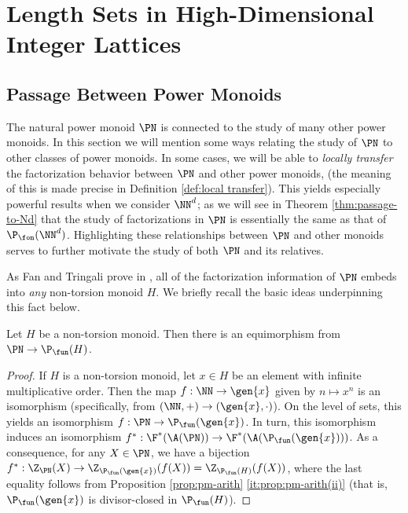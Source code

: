 
\chapter{Length Sets in High-Dimensional Integer Lattices} \label{ch:lattices}
\section{Passage Between Power Monoids}\label{sec:passage}


The natural power monoid $\PN$ is connected to the study of many other power monoids.
In this section we will mention some ways relating the study of $\PN$ to other classes of power monoids.
In some cases, we will be able to \textit{locally transfer} the factorization behavior between $\PN$ and other power monoids, (the meaning of this is made precise in Definition \ref{def:local transfer}).
This yields especially powerful results when we consider $\NN^d$; as we will see in Theorem \ref{thm:passage-to-Nd} that the study of factorizations in $\PN$ is essentially the same as that of $\P_\fon(\NN^d)$.
Highlighting these relationships between $\PN$ and other monoids serves to further motivate the study of both $\PN$ and its relatives.


As Fan and Tringali prove in \cite[Theorem 3.8, Theorem 4.11]{fan-tringali18}, all of the factorization information of $\PN$ embeds into \textit{any} non-torsion monoid $H$.
We briefly recall the basic ideas underpinning this fact below.

\begin{prop}\label{prop:natural-to-non-tors}
	Let $H$ be a non-torsion monoid.
	Then there is an equimorphism from $\PN \to \P_\fun(H)$.
\end{prop}
\begin{proof}
	If $H$ is a non-torsion monoid, let $x\in H$ be an element with infinite multiplicative order.  
	Then the map $f: \NN \to \gen{x}$ given by $n\mapsto x^n$ is an isomorphism (specifically, from $(\NN,+)\to (\gen{x},\cdot)$).
	On the level of sets, this yields an isomorphism $f: \PN \to \P_\fun(\gen{x})$.
	In turn, this isomorphism induces an isomorphism $f^*: \F^*(\A(\PN)) \to \F^*(\A(\P_\fun(\gen{x})))$.
	As a consequence, for any $X \in \PN$, we have a bijection $f^*: \Z_{\PN}(X) \to \Z_{\P_\fun(\gen{x})}(f(X)) = \Z_{\P_\fun(H)}(f(X))$, where the last equality follows from Proposition \ref{prop:pm-arith} \ref{it:prop:pm-arith(ii)} (that is, $\P_\fun(\gen{x})$ is divisor-closed in $\P_\fun(H)$).
\end{proof}

